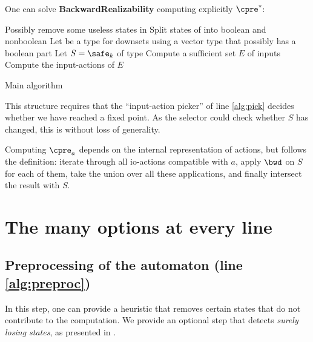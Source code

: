 \documentclass[sigconf,screen,nonacm]{acmart}
\begin{document}
One can
solve \textbf{BackwardRealizability} computing
explicitly \(\cpre^*\):
\begin{algorithm}
  \LinesNumbered
{}

\BlankLine

Possibly remove some useless states in \cA\;\label{alg:preproc}
Split states of \cA into boolean and nonboolean\;\label{alg:bool}
Let \Downset be a type for downsets using a vector type that possibly has a
boolean part\;\label{alg:types}
Let \(S = \safe_k\) of type \Downset\;
Compute a sufficient set \(E\) of  inputs\;\label{alg:inputs}
Compute the input-actions of \(E\)\;\label{alg:actions}
\caption{Main algorithm}\label{main_algo}
\end{algorithm}

This structure requires that the ``input-action picker'' of line \ref{alg:pick}
decides whether we have reached a fixed point.  As the selector could check
whether \(S\) has changed, this is without loss of generality.

Computing \(\cpre_a\) depends on the internal representation of actions, but
follows the definition:
iterate through all %
io-actions
compatible with \(a\), %
apply \(\bwd\) on \(S\) for each of them, take the union
over all these applications, and finally intersect the result with \(S\).

\section{The many options at every line}\label{sec:implem}

\subsection{Preprocessing of the automaton (line \ref{alg:preproc})}

In this step, one can provide a heuristic that removes certain states that
do not contribute to the computation.  We provide an optional step that
detects \emph{surely losing states}, as presented in \cite{ggs14}.
\end{document}
